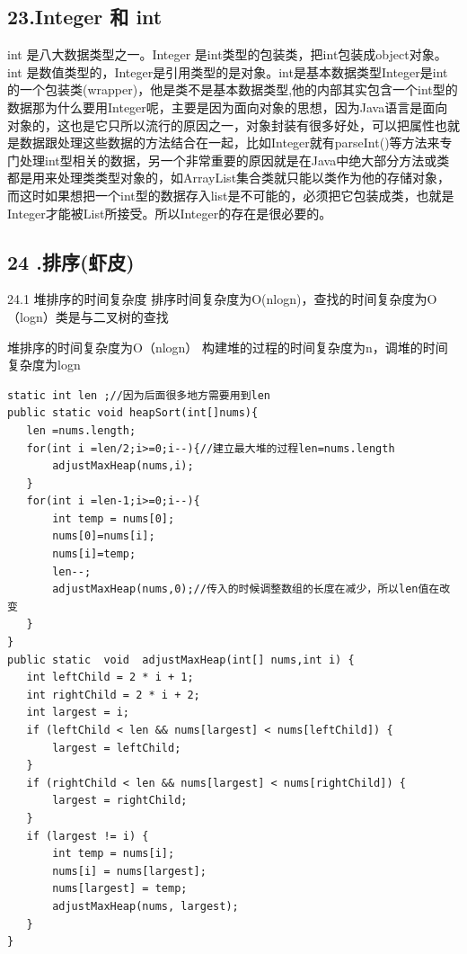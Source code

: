 \documentclass[UTF8]{ctexart}
\begin{document}
\subsection{23.Integer 和 int}

int 是八大数据类型之一。Integer 是int类型的包装类，把int包装成object对象。int 是数值类型的，Integer是引用类型的是对象。int是基本数据类型Integer是int的一个包装类(wrapper)，他是类不是基本数据类型,他的内部其实包含一个int型的数据那为什么要用Integer呢，主要是因为面向对象的思想，因为Java语言是面向对象的，这也是它只所以流行的原因之一，对象封装有很多好处，可以把属性也就是数据跟处理这些数据的方法结合在一起，比如Integer就有parseInt()等方法来专门处理int型相关的数据，另一个非常重要的原因就是在Java中绝大部分方法或类都是用来处理类类型对象的，如ArrayList集合类就只能以类作为他的存储对象，而这时如果想把一个int型的数据存入list是不可能的，必须把它包装成类，也就是Integer才能被List所接受。所以Integer的存在是很必要的。

\subsection{24 .排序(虾皮)}

24.1 堆排序的时间复杂度
排序时间复杂度为O(nlogn)，查找的时间复杂度为O（logn）类是与二叉树的查找

堆排序的时间复杂度为O（nlogn） 构建堆的过程的时间复杂度为n，调堆的时间复杂度为logn

\begin{lstlisting}
static int len ;//因为后面很多地方需要用到len
public static void heapSort(int[]nums){
   len =nums.length;
   for(int i =len/2;i>=0;i--){//建立最大堆的过程len=nums.length
       adjustMaxHeap(nums,i);
   }
   for(int i =len-1;i>=0;i--){
       int temp = nums[0];
       nums[0]=nums[i];
       nums[i]=temp;
       len--;
       adjustMaxHeap(nums,0);//传入的时候调整数组的长度在减少，所以len值在改变
   }
}
public static  void  adjustMaxHeap(int[] nums,int i) {
   int leftChild = 2 * i + 1;
   int rightChild = 2 * i + 2;
   int largest = i;
   if (leftChild < len && nums[largest] < nums[leftChild]) {
       largest = leftChild;
   }
   if (rightChild < len && nums[largest] < nums[rightChild]) {
       largest = rightChild;
   }
   if (largest != i) {
       int temp = nums[i];
       nums[i] = nums[largest];
       nums[largest] = temp;
       adjustMaxHeap(nums, largest);
   }
}
\end{lstlisting}
\end{document}
